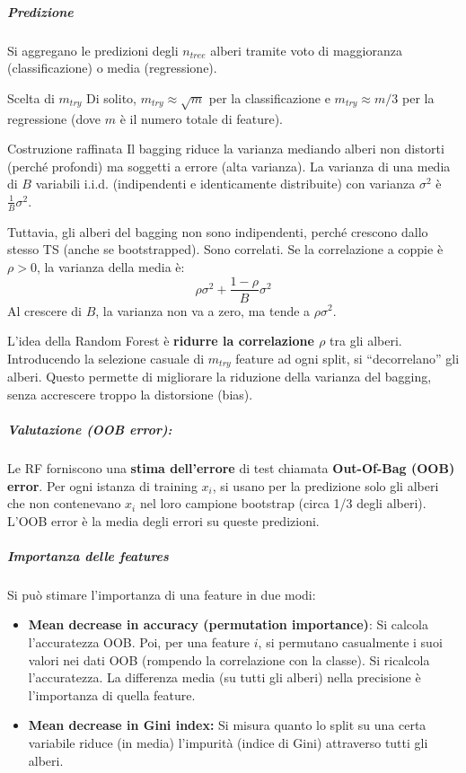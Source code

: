 \subparagraph{Predizione}
Si aggregano le predizioni degli $n_{tree}$ alberi tramite voto di maggioranza
(classificazione) o media (regressione).

\begin{nota}{Scelta di $m_{try}$}{}
Di solito, $m_{try} \approx \sqrt{m}$ per la classificazione e
$m_{try} \approx m/3$ per la regressione (dove $m$ è il numero totale di
feature).
\end{nota}

\begin{nota}{Costruzione raffinata}{}
Il bagging riduce la varianza mediando alberi non distorti (perché profondi)
ma soggetti a errore (alta varianza).
La varianza di una media di $B$ variabili i.i.d. (indipendenti e identicamente
distribuite) con varianza $\sigma^2$ è $\frac{1}{B}\sigma^2$.

Tuttavia, gli alberi del bagging non sono indipendenti, perché crescono dallo
stesso TS (anche se bootstrapped).
Sono correlati. Se la correlazione a coppie è $\rho > 0$, la varianza della
media è:
\[
\rho\sigma^2 + \frac{1-\rho}{B}\sigma^2
\]
Al crescere di $B$, la varianza non va a zero, ma tende a $\rho\sigma^2$.

L'idea della Random Forest è \textbf{ridurre la correlazione $\rho$} tra gli
alberi. Introducendo la selezione casuale di $m_{try}$ feature ad ogni split,
si ``decorrelano'' gli alberi. Questo permette di migliorare la riduzione della
varianza del bagging, senza accrescere troppo la distorsione (bias).
\end{nota}

\subparagraph{Valutazione (OOB error):}
Le RF forniscono una \textbf{stima dell'errore} di test chiamata
\textbf{Out-Of-Bag (OOB) error}.
Per ogni istanza di training $x_i$, si usano per la predizione solo gli alberi
che non contenevano $x_i$ nel loro campione bootstrap (circa 1/3 degli alberi).
L'OOB error è la media degli errori su queste predizioni.

\subparagraph{Importanza delle features}

Si può stimare l'importanza di una feature in due modi:
\begin{itemize}
    \item \textbf{Mean decrease in accuracy (permutation importance)}: Si
    calcola l'accuratezza OOB. Poi, per una feature $i$, si permutano
    casualmente i suoi valori nei dati OOB (rompendo la correlazione con la
    classe). Si ricalcola l'accuratezza. La differenza media (su tutti gli
    alberi) nella precisione è l'importanza di quella feature.
    \item \textbf{Mean decrease in Gini index:} Si misura quanto lo split su
    una certa variabile riduce (in media) l'impurità (indice di Gini)
    attraverso tutti gli alberi.
\end{itemize}


